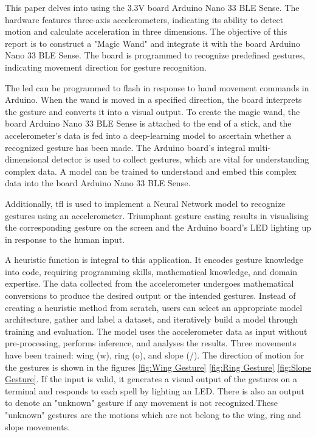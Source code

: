 	This paper delves into using the 3.3V board Arduino Nano 33 BLE Sense. The hardware features three-axis accelerometers, indicating its ability to detect motion and calculate acceleration in three dimensions\cite{Ard:2021}. The objective of this report is to construct a "Magic Wand" and integrate it with the board Arduino Nano 33 BLE Sense. The board is programmed to recognize predefined gestures, indicating movement direction for gesture recognition.
	
	
	The \ac{led} can be programmed to flash in response to hand movement commands in Arduino. When the wand is moved in a specified direction, the board interprets the gesture and converts it into a visual output. To create the magic wand, the board Arduino Nano 33 BLE Sense is attached to the end of a stick, and the accelerometer's data is fed into a deep-learning model to ascertain whether a recognized gesture has been made. The Arduino board's integral multi-dimensional detector is used to collect gestures, which are vital for understanding complex data. A model can be trained to understand and embed this complex data into the board Arduino Nano 33 BLE Sense.
	
	
	Additionally, \ac{tfl} is used to implement a Neural Network model to recognize gestures using an accelerometer. Triumphant gesture casting results in visualising the corresponding gesture on the screen and the Arduino board's LED lighting up in response to the human input.
	
	A heuristic function is integral to this application. It encodes gesture knowledge into code, requiring programming skills, mathematical knowledge, and domain expertise. The data collected from the accelerometer undergoes mathematical conversions to produce the desired output or the intended gestures. Instead of creating a heuristic method from scratch, users can select an appropriate model architecture, gather and label a dataset, and iteratively build a model through training and evaluation. The model uses the accelerometer data as input without pre-processing, performs inference, and analyses the results. Three movements have been trained: wing (w), ring (o), and slope (/). The direction of motion for the gestures is shown in the figures \ref{fig:Wing Gesture} \ref{fig:Ring Gesture} \ref{fig:Slope Gesture}. If the input is valid, it generates a visual output of the gestures on a terminal and responds to each spell by lighting an LED. There is also an output to denote an "unknown" gesture if any movement is not recognized.These "unknown" gestures are the motions which are not belong to the wing, ring and slope movements.
	
